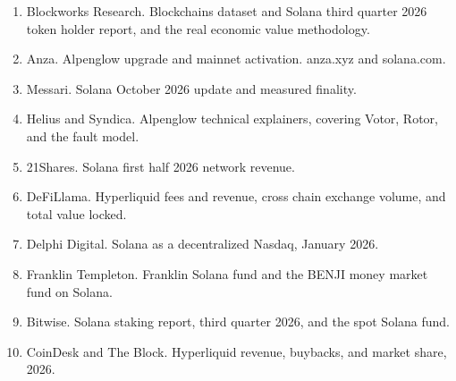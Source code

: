 \documentclass[11pt]{article}
\begin{document}
\begin{enumerate}[leftmargin=1.5em,itemsep=2pt,topsep=2pt]
  \item Blockworks Research. Blockchains dataset and Solana third quarter 2026 token holder report, and the real economic value methodology.
  \item Anza. Alpenglow upgrade and mainnet activation. anza.xyz and solana.com.
  \item Messari. Solana October 2026 update and measured finality.
  \item Helius and Syndica. Alpenglow technical explainers, covering Votor, Rotor, and the fault model.
  \item 21Shares. Solana first half 2026 network revenue.
  \item DeFiLlama. Hyperliquid fees and revenue, cross chain exchange volume, and total value locked.
  \item Delphi Digital. Solana as a decentralized Nasdaq, January 2026.
  \item Franklin Templeton. Franklin Solana fund and the BENJI money market fund on Solana.
  \item Bitwise. Solana staking report, third quarter 2026, and the spot Solana fund.
  \item CoinDesk and The Block. Hyperliquid revenue, buybacks, and market share, 2026.
\end{enumerate}
\end{document}
